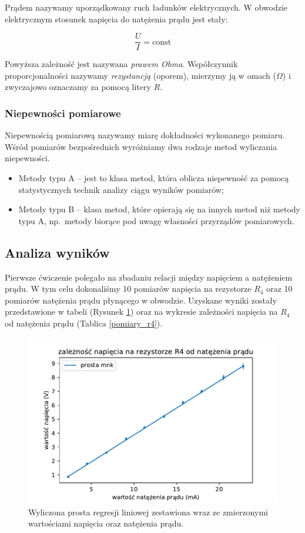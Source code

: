 \documentclass[a4paper]{article}
\newlength{\du}
\begin{document}
Prądem nazywamy uporządkowany ruch ładunków elektrycznych.
W obwodzie elektrycznym stosunek napięcia do natężenia prądu jest stały:

$$\frac{U}{I} = \text{const}$$

Powyższa zależność jest nazywana \emph{prawem Ohma}. Współczynnik proporcjonalności nazywamy \emph{rezystancją} (oporem), mierzymy ją w omach ($\Omega$) i zwyczajowo oznaczamy za pomocą litery $R$.

\subsubsection{Niepewności pomiarowe}

Niepewnością pomiarową nazywamy miarę dokładności wykonanego pomiaru.
Wśród pomiarów bezpośrednich wyróżniamy dwa rodzaje metod wyliczania niepewności.

\begin{itemize}
\item Metody typu A -- jest to klasa metod, która oblicza niepewność za pomocą statystycznych technik analizy ciągu 	wyników pomiarów;
\item Metody typu B -- klasa metod, które opierają się na innych metod niż metody typu A, np.~metody biorące pod uwagę własności przyrządów pomiarowych.
\end{itemize}

\subsection{Analiza wyników}

Pierwsze ćwiczenie polegało na zbadaniu relacji między napięciem a natężeniem prądu.
W tym celu dokonaliśmy 10 pomiarów napięcia na rezystorze $R_4$ oraz 10 pomiarów natężenia prądu płynącego w obwodzie.
Uzyskane wyniki zostały przedstawione w tabeli (Rysunek \ref{wykres}) oraz na wykresie zależności napięcia na $R_4$ od natężenia prądu (Tablica \ref{pomiary_r4}).

\newpage

\begin{figure}
\centering
\includegraphics[scale=0.7]{fig_d.pdf}
\caption{Wyliczona prosta regresji liniowej zestawiona wraz ze zmierzonymi wartościami napięcia oraz natężenia prądu.}
\label{wykres}
\end{figure}
\end{document}
